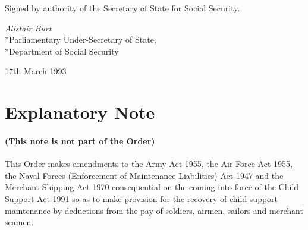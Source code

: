 \documentclass[a4paper]{article}
\newcommand{\parthead}{}
\begin{document}
\bigskip

Signed by authority of the Secretary of State for Social Security.

{\raggedleft
\emph{Alistair Burt}\\*Parliamentary Under-Secretary of State,\\*Department of Social Security

}

17th March 1993

\part{Explanatory Note}

\renewcommand\parthead{--- Explanatory Note}

\subsection*{(This note is not part of the Order)}

This Order makes amendments to the Army Act 1955, the Air Force Act 1955, the Naval Forces (Enforcement of Maintenance Liabilities) Act 1947 and the Merchant Shipping Act 1970 consequential on the coming into force of the Child Support Act 1991 so as to make provision for the recovery of child support maintenance by deductions from the pay of soldiers, airmen, sailors and merchant seamen.
\end{document}
